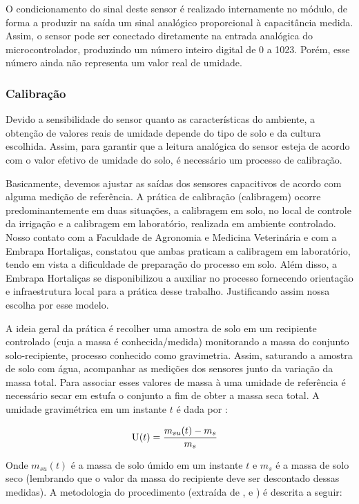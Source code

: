 		O condicionamento do sinal deste sensor é realizado internamente no módulo, de forma a produzir na saída um sinal analógico proporcional à capacitância medida. Assim, o sensor pode ser conectado diretamente na entrada analógica do microcontrolador, produzindo um número inteiro digital de 0 a 1023. Porém, esse número ainda não representa um valor real de umidade.

		\subsubsection{Calibração}

		Devido a sensibilidade do sensor quanto as características do ambiente, a obtenção de valores reais de umidade depende do tipo de solo e da cultura escolhida. Assim, para garantir que a leitura analógica do sensor esteja de acordo com o valor efetivo de umidade do solo, é necessário um processo de calibração. 
		
		Basicamente, devemos ajustar as saídas dos sensores capacitivos de acordo com alguma medição de referência. A prática de calibração (calibragem) ocorre predominantemente em duas situações, a calibragem em solo, no local de controle da irrigação e a calibragem em laboratório, realizada em ambiente controlado. Nosso contato com a Faculdade de Agronomia e Medicina Veterinária e com a Embrapa Hortaliças, constatou que ambas praticam a calibragem em laboratório, tendo em vista a dificuldade de preparação do processo em solo. Além disso, a Embrapa Hortaliças se disponibilizou a auxiliar no processo fornecendo orientação e infraestrutura local para a prática desse trabalho. Justificando assim nossa escolha por esse modelo.
		
		A ideia geral da prática é recolher uma amostra de solo em um recipiente controlado (cuja a massa é conhecida/medida) monitorando a massa do conjunto solo-recipiente, processo conhecido como gravimetria. Assim, saturando a amostra de solo com água, acompanhar as medições dos sensores junto da variação da massa total. Para associar esses valores de massa à uma umidade de referência é necessário secar em estufa o conjunto a fim de obter a massa seca total. A umidade gravimétrica em um instante $t$ é dada por \cite{bib_sen_02_ian}:
		
		\begin{align*}
			\textsc{U}(t) &= \frac{m_{su}(t)-m_{s}}{m_{s}} 
		\end{align*}
		
		Onde $m_{su}(t)$ é a massa de solo úmido em um instante $t$ e $m_{s}$ é a massa de solo seco (lembrando que o valor da massa do recipiente deve ser descontado dessas medidas). A metodologia do procedimento (extraída de \cite{bib_sen_01_ian}, \cite{bib_sen_02_ian} e \cite{bib_sen_03_ian}) é descrita a seguir:
		
